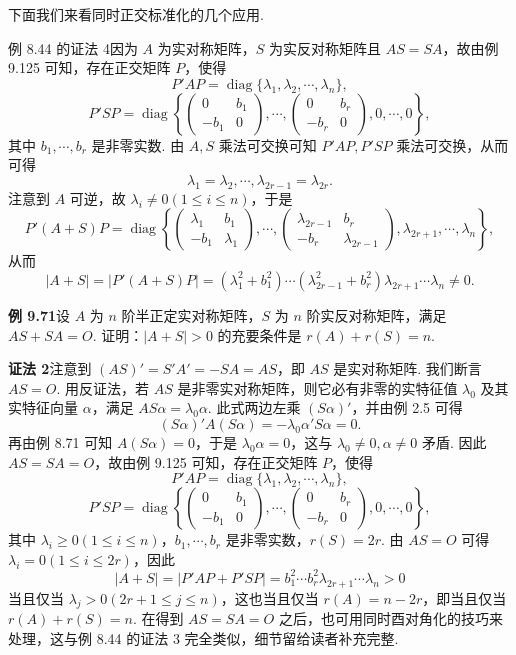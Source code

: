 \documentclass[UTF8, 12pt, fontset=fandol, oneside]{ctexart}
\begin{document}
下面我们来看同时正交标准化的几个应用.

例 8.44 的证法 4\quad 因为 $A$ 为实对称矩阵，$S$ 为实反对称矩阵且 $AS=SA$，故由例 9.125 可知，存在正交矩阵 $P$，使得
\[
P'AP=\operatorname{diag}\{\lambda_1,\lambda_2,\cdots,\lambda_n\},
\]
\[
P'SP=\operatorname{diag}\left\{
\begin{pmatrix}
0&b_1\\
-b_1&0
\end{pmatrix},\cdots,
\begin{pmatrix}
0&b_r\\
-b_r&0
\end{pmatrix},
0,\cdots,0
\right\},
\]
其中 $b_1,\cdots,b_r$ 是非零实数. 由 $A,S$ 乘法可交换可知 $P'AP,P'SP$ 乘法可交换，从而可得
\[
\lambda_1=\lambda_2,\cdots,\lambda_{2r-1}=\lambda_{2r}.
\]
注意到 $A$ 可逆，故 $\lambda_i\ne0(1\le i\le n)$，于是
\[
P'(A+S)P=\operatorname{diag}\left\{
\begin{pmatrix}
\lambda_1&b_1\\
-b_1&\lambda_1
\end{pmatrix},\cdots,
\begin{pmatrix}
\lambda_{2r-1}&b_r\\
-b_r&\lambda_{2r-1}
\end{pmatrix},
\lambda_{2r+1},\cdots,\lambda_n
\right\},
\]
从而
\[
|A+S|=|P'(A+S)P|=(\lambda_1^2+b_1^2)\cdots(\lambda_{2r-1}^2+b_r^2)\lambda_{2r+1}\cdots\lambda_n\ne0.
\]

\noindent\textbf{例 9.71}\quad 设 $A$ 为 $n$ 阶半正定实对称矩阵，$S$ 为 $n$ 阶实反对称矩阵，满足 $AS+SA=O$. 证明：$|A+S|>0$ 的充要条件是 $r(A)+r(S)=n$.

\noindent\textbf{证法 2}\quad 注意到 $(AS)'=S'A'=-SA=AS$，即 $AS$ 是实对称矩阵. 我们断言 $AS=O$. 用反证法，若 $AS$ 是非零实对称矩阵，则它必有非零的实特征值 $\lambda_0$ 及其实特征向量 $\alpha$，满足 $AS\alpha=\lambda_0\alpha$. 此式两边左乘 $(S\alpha)'$，并由例 2.5 可得
\[
(S\alpha)'A(S\alpha)=-\lambda_0\alpha'S\alpha=0.
\]
再由例 8.71 可知 $A(S\alpha)=0$，于是 $\lambda_0\alpha=0$，这与 $\lambda_0\ne0,\alpha\ne0$ 矛盾. 因此 $AS=SA=O$，故由例 9.125 可知，存在正交矩阵 $P$，使得
\[
P'AP=\operatorname{diag}\{\lambda_1,\lambda_2,\cdots,\lambda_n\},
\]
\[
P'SP=\operatorname{diag}\left\{
\begin{pmatrix}
0&b_1\\
-b_1&0
\end{pmatrix},\cdots,
\begin{pmatrix}
0&b_r\\
-b_r&0
\end{pmatrix},
0,\cdots,0
\right\},
\]
其中 $\lambda_i\ge0(1\le i\le n)$，$b_1,\cdots,b_r$ 是非零实数，$r(S)=2r$. 由 $AS=O$ 可得 $\lambda_i=0(1\le i\le2r)$，因此
\[
|A+S|=|P'AP+P'SP|=b_1^2\cdots b_r^2\lambda_{2r+1}\cdots\lambda_n>0
\]
当且仅当 $\lambda_j>0(2r+1\le j\le n)$，这也当且仅当 $r(A)=n-2r$，即当且仅当 $r(A)+r(S)=n$. 在得到 $AS=SA=O$ 之后，也可用同时酉对角化的技巧来处理，这与例 8.44 的证法 3 完全类似，细节留给读者补充完整.
\end{document}
